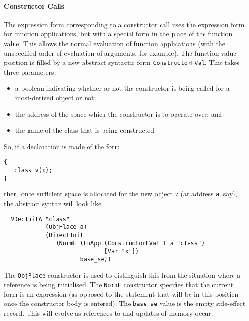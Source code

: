 \documentclass[11pt]{article}
\begin{document}
\paragraph{Constructor Calls}
The expression form corresponding to a constructor call uses the
expression form for function applications, but with a special form in
the place of the function value.  This allows the normal evaluation of
function applications (with the unspecified order of evaluation of
arguments, for example).  The function value position is filled by a
new abstract syntactic form \texttt{ConstructorFVal}.  This takes
three parameters:
\begin{itemize}
\item a boolean indicating whether or not the constructor is being
  called for a most-derived object or not;
\item the address of the space which the constructor is to operate
  over; and
\item the name of the class that is being constructed
\end{itemize}
So, if a declaration is made of the form
\begin{verbatim}
{
   class v(x);
}
\end{verbatim}
then, once sufficient space is allocated for the new object \texttt{v}
(at address \texttt{a}, say), the abstract syntax will look like
\begin{verbatim}
  VDecInitA "class"
            (ObjPlace a)
            (DirectInit
               (NormE (FnApp (ConstructorFVal T a "class")
                             [Var "x"])
                      base_se))
\end{verbatim}
The \texttt{ObjPlace} constructor is used to distinguish this from the
situation where a reference is being initialised.  The \texttt{NormE}
constructor specifies that the current form is an expression (as
opposed to the statement that will be in this position once the
constructor body is entered).  The \texttt{base_se} value is the empty
side-effect record.  This will evolve as references to and updates of
memory occur.
\end{document}
